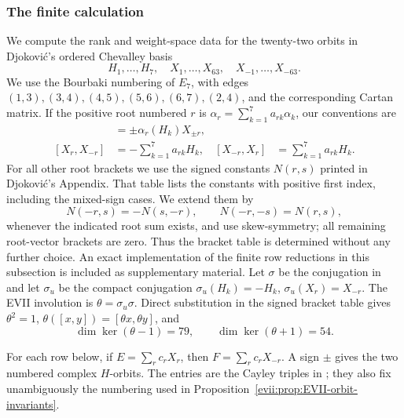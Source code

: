 \documentclass[10pt,a4paper]{amsart}
\numberwithin{equation}{section}
\begin{document}
\subsubsection{The finite calculation}

We compute the rank and weight-space data for the twenty-two orbits in
Djokovi\'c's ordered
Chevalley basis
\[
 H_1,\ldots,H_7,\quad X_1,\ldots,X_{63},\quad
 X_{-1},\ldots,X_{-63}.
\]
We use the Bourbaki numbering of $E_7$, with edges
$(1,3),(3,4),(4,5),(5,6),(6,7),(2,4)$, and the corresponding Cartan matrix.
If the positive root numbered $r$ is
$\alpha_r=\sum_{k=1}^7a_{rk}\alpha_k$, our conventions are
\begin{align*}
 [H_k,X_{\pm r}]&=\pm\alpha_r(H_k)X_{\pm r},\\
 [X_r,X_{-r}]&=-\sum_{k=1}^7a_{rk}H_k,
 & [X_{-r},X_r]&=\sum_{k=1}^7a_{rk}H_k.
\end{align*}
For all other root brackets we use the signed constants $N(r,s)$ printed in
Djokovi\'c's Appendix.  That table lists the constants with positive first
index, including the mixed-sign cases.  We extend them by
\[
 N(-r,s)=-N(s,-r),\qquad N(-r,-s)=N(r,s),
\]
whenever the indicated root sum exists, and use skew-symmetry; all remaining
root-vector brackets are zero.  Thus the bracket table is determined without
any further choice.  An exact implementation of the finite row reductions in
this subsection is included as supplementary material.  Let $\sigma$ be the
conjugation in
\cite[Table~3]{Djokovic} and let $\sigma_u$ be the compact conjugation
$\sigma_u(H_k)=-H_k$, $\sigma_u(X_r)=X_{-r}$.  The EVII involution is
$\theta=\sigma_u\sigma$.  Direct substitution in the signed bracket table
gives $\theta^2=1$, $\theta([x,y])=[\theta x,\theta y]$, and
\[
 \dim\ker(\theta-1)=79,\qquad \dim\ker(\theta+1)=54.
\]

For each row below, if $E=\sum_rc_rX_r$, then
$F=\sum_rc_rX_{-r}$.  A sign $\pm$ gives the two numbered complex
$H$-orbits.  The entries are the Cayley triples in
\cite[Table~6]{Djokovic}; they also fix unambiguously the numbering used in
Proposition~\ref{evii:prop:EVII-orbit-invariants}.
\end{document}
